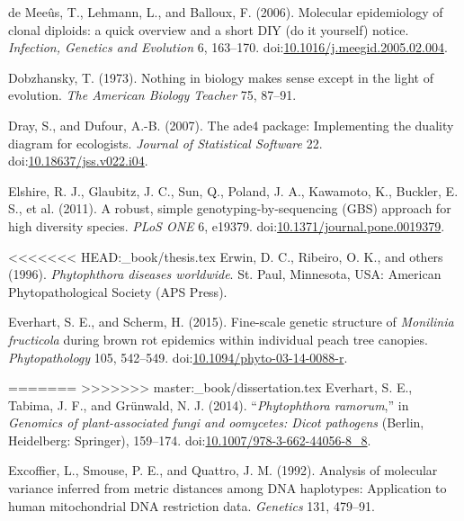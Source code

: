 \documentclass[double,12pt]{beavtex}
\begin{document}
  \hypertarget{ref-de2006molecular}{}
  de Meeûs, T., Lehmann, L., and Balloux, F. (2006). Molecular
  epidemiology of clonal diploids: a quick overview and a short DIY (do it
  yourself) notice. \emph{Infection, Genetics and Evolution} 6, 163--170.
  doi:\href{https://doi.org/10.1016/j.meegid.2005.02.004}{10.1016/j.meegid.2005.02.004}.
  
  \hypertarget{ref-dobzhansky2013nothing}{}
  Dobzhansky, T. (1973). Nothing in biology makes sense except in the
  light of evolution. \emph{The American Biology Teacher} 75, 87--91.
  
  \hypertarget{ref-dray2007ade4}{}
  Dray, S., and Dufour, A.-B. (2007). The ade4 package: Implementing the
  duality diagram for ecologists. \emph{Journal of Statistical Software}
  22.
  doi:\href{https://doi.org/10.18637/jss.v022.i04}{10.18637/jss.v022.i04}.
  
  \hypertarget{ref-elshire2011robust}{}
  Elshire, R. J., Glaubitz, J. C., Sun, Q., Poland, J. A., Kawamoto, K.,
  Buckler, E. S., et al. (2011). A robust, simple genotyping-by-sequencing
  (GBS) approach for high diversity species. \emph{PLoS ONE} 6, e19379.
  doi:\href{https://doi.org/10.1371/journal.pone.0019379}{10.1371/journal.pone.0019379}.
  
<<<<<<< HEAD:_book/thesis.tex
  \hypertarget{ref-erwin1996phytophthora}{}
  Erwin, D. C., Ribeiro, O. K., and others (1996). \emph{Phytophthora
  diseases worldwide}. St. Paul, Minnesota, USA: American
  Phytopathological Society (APS Press).
  
  \hypertarget{ref-everhart2014fine}{}
  Everhart, S. E., and Scherm, H. (2015). Fine-scale genetic structure of
  \emph{Monilinia fructicola} during brown rot epidemics within individual
  peach tree canopies. \emph{Phytopathology} 105, 542--549.
  doi:\href{https://doi.org/10.1094/phyto-03-14-0088-r}{10.1094/phyto-03-14-0088-r}.
  
=======
>>>>>>> master:_book/dissertation.tex
  \hypertarget{ref-everhart2014phytophthora}{}
  Everhart, S. E., Tabima, J. F., and Grünwald, N. J. (2014).
  ``\emph{Phytophthora ramorum},'' in \emph{Genomics of plant-associated
  fungi and oomycetes: Dicot pathogens} (Berlin, Heidelberg: Springer),
  159--174.
  doi:\href{https://doi.org/10.1007/978-3-662-44056-8_8}{10.1007/978-3-662-44056-8\_8}.
  
  \hypertarget{ref-excoffier1992analysis}{}
  Excoffier, L., Smouse, P. E., and Quattro, J. M. (1992). Analysis of
  molecular variance inferred from metric distances among DNA haplotypes:
  Application to human mitochondrial DNA restriction data. \emph{Genetics}
  131, 479--91.
  
\end{document}
